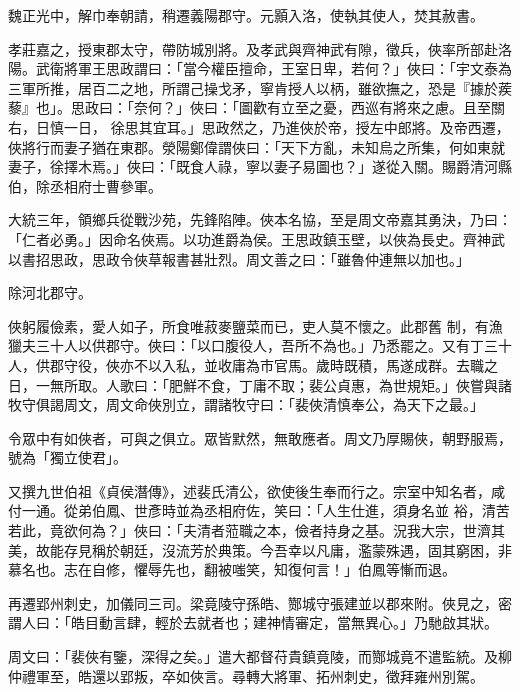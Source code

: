 \begin{pinyinscope}
 魏正光中，解巾奉朝請，稍遷義陽郡守。元顥入洛，使執其使人，焚其赦書。



 孝莊嘉之，授東郡太守，帶防城別將。及孝武與齊神武有隙，徵兵，俠率所部赴洛陽。武衛將軍王思政謂曰：「當今權臣擅命，王室日卑，若何？」俠曰：「宇文泰為三軍所推，居百二之地，所謂己操戈矛，寧肯授人以柄，雖欲撫之，恐是『據於蒺藜』也」。思政曰：「奈何？」俠曰：「圖歡有立至之憂，西巡有將來之慮。且至關右，日慎一日，
 徐思其宜耳。」思政然之，乃進俠於帝，授左中郎將。及帝西遷，俠將行而妻子猶在東郡。滎陽鄭偉謂俠曰：「天下方亂，未知烏之所集，何如東就妻子，徐擇木焉。」俠曰：「既食人祿，寧以妻子易圖也？」遂從入關。賜爵清河縣伯，除丞相府士曹參軍。



 大統三年，領鄉兵從戰沙苑，先鋒陷陣。俠本名協，至是周文帝嘉其勇決，乃曰：「仁者必勇。」因命名俠焉。以功進爵為侯。王思政鎮玉壁，以俠為長史。齊神武以書招思政，思政令俠草報書甚壯烈。周文善之曰：「雖魯仲連無以加也。」



 除河北郡守。



 俠躬履儉素，愛人如子，所食唯菽麥鹽菜而已，吏人莫不懷之。此郡舊
 制，有漁獵夫三十人以供郡守。俠曰：「以口腹役人，吾所不為也。」乃悉罷之。又有丁三十人，供郡守役，俠亦不以入私，並收庸為市官馬。歲時既積，馬遂成群。去職之日，一無所取。人歌曰：「肥鮮不食，丁庸不取；裴公貞惠，為世規矩。」俠嘗與諸牧守俱謁周文，周文命俠別立，謂諸牧守曰：「裴俠清慎奉公，為天下之最。」



 令眾中有如俠者，可與之俱立。眾皆默然，無敢應者。周文乃厚賜俠，朝野服焉，號為「獨立使君」。



 又撰九世伯祖《貞侯潛傳》，述裴氏清公，欲使後生奉而行之。宗室中知名者，咸付一通。從弟伯鳳、世彥時並為丞相府佐，笑曰：「人生仕進，須身名並
 裕，清苦若此，竟欲何為？」俠曰：「夫清者蒞職之本，儉者持身之基。況我大宗，世濟其美，故能存見稱於朝廷，沒流芳於典策。今吾幸以凡庸，濫蒙殊遇，固其窮困，非慕名也。志在自修，懼辱先也，翻被嗤笑，知復何言！」伯鳳等慚而退。



 再遷郢州刺史，加儀同三司。梁竟陵守孫皓、酂城守張建並以郡來附。俠見之，密謂人曰：「皓目動言肆，輕於去就者也；建神情審定，當無異心。」乃馳啟其狀。



 周文曰：「裴俠有鑒，深得之矣。」遣大都督苻貴鎮竟陵，而酂城竟不遣監統。及柳仲禮軍至，皓還以郢叛，卒如俠言。尋轉大將軍、拓州刺史，徵拜雍州別駕。




\end{pinyinscope}
